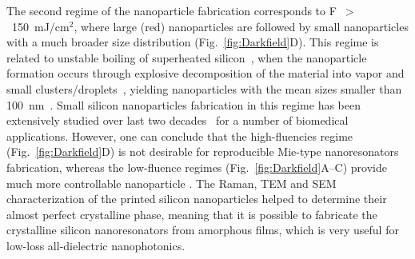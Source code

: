                 The second regime of the nanoparticle fabrication corresponds to F~$>$~150~mJ/cm$^{2}$, where large (red) nanoparticles
            are followed by small nanoparticles with a much broader size distribution (Fig.~\ref{fig:Darkfield}D). This regime is related to
            unstable boiling of superheated silicon~\cite{bulgakova2001pulsed, ionin2013thermal, wu2014microscopic}, when the
            nanoparticle formation occurs through explosive decomposition of the material into vapor and small
            clusters/droplets~\cite{itina2009molecular,wu2014microscopic}, yielding nanoparticles with the mean sizes smaller than
            100~nm~\cite{amoruso2004generation}. Small silicon nanoparticles fabrication in this regime has been extensively studied
            over last two decades~\cite{amoruso2004generation, tull2006formation} for a number of biomedical applications.
            However, one can conclude that the high-fluencies regime (Fig.~\ref{fig:Darkfield}D) is not desirable for reproducible Mie-type
            nanoresonators fabrication, whereas the low-fluence regimes (Fig.~\ref{fig:Darkfield}A--C) provide much more controllable
            nanoparticle . The Raman, TEM and SEM characterization of the printed silicon nanoparticles
            helped to determine their almost perfect crystalline phase, meaning that it is possible to fabricate the crystalline
            silicon nanoresonators from amorphous films, which is very useful for low-loss all-dielectric nanophotonics.

    \subsection{}
        \label{sec:DarkfieldExp}


